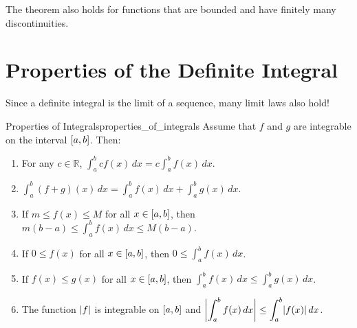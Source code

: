 \begin{Remark}{}{}
    The theorem also holds for functions that are bounded and have finitely many
    discontinuities.
\end{Remark}

\section{Properties of the Definite Integral}

Since a definite integral is the limit of a sequence, many limit laws also hold!

\begin{Theorem}{Properties of Integrals}{properties_of_integrals}
    Assume that $ f $ and $ g $ are integrable on the interval $ \interval{a}{b} $. Then:
    \begin{enumerate}[label=(\arabic*)]
        \item\label{property_integral_1} For any $ c\in\mathbb{R} $,
              $ \displaystyle\int_{a}^{b} cf(x)\, d{x} = c \int_{a}^{b} f(x)\, d{x} $.
        \item\label{property_integral_2}
              $ \displaystyle \int_{a}^{b} (f+g)(x)\, d{x} = \int_{a}^{b} f(x)\, d{x} +
                  \int_{a}^{b} g(x)\, d{x} $.
        \item\label{property_integral_3} If $ m\le f(x)\le M $ for all $ x\in\interval{a}{b} $,
              then
              $ \displaystyle m(b-a)\le \int_{a}^{b} f(x)\, d{x} \le M(b-a) $.
        \item\label{property_integral_4} If $ 0\le f(x) $ for all $ x\in\interval{a}{b} $, then
              $ \displaystyle 0\le \int_{a}^{b} f(x)\, d{x} $.
        \item\label{property_integral_5} If $ f(x)\le g(x) $ for all $ x\in\interval{a}{b} $, then
              $ \displaystyle \int_{a}^{b} f(x)\, d{x} \le \int_{a}^{b} g(x)\, d{x} $.
        \item\label{property_integral_6} The function
              $ \abs{f} $ is integrable on $ \interval{a}{b} $ and
              $ \displaystyle \abs[\bigg]{\int_{a}^{b} f(x)\, d{x}}
                  \le \int_{a}^{b} \abs{f(x)}\, d{x} $.
    \end{enumerate}
\end{Theorem}

